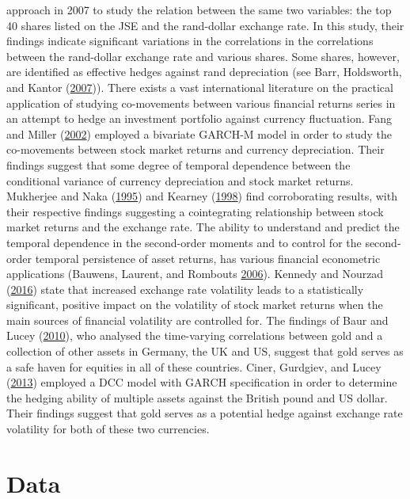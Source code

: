\documentclass[11pt,preprint, authoryear]{elsarticle}
\numberwithin{equation}{section}
\numberwithin{figure}{section}
\numberwithin{table}{section}
\begin{document}
approach in 2007 to study the relation between the same two variables:
the top 40 shares listed on the JSE and the rand-dollar exchange rate.
In this study, their findings indicate significant variations in the
correlations in the correlations between the rand-dollar exchange rate
and various shares. Some shares, however, are identified as effective
hedges against rand depreciation (see Barr, Holdsworth, and Kantor
(\protect\hyperlink{ref-barr2007}{2007})). There exists a vast
international literature on the practical application of studying
co-movements between various financial returns series in an attempt to
hedge an investment portfolio against currency fluctuation. Fang and
Miller (\protect\hyperlink{ref-fang2002}{2002}) employed a bivariate
GARCH-M model in order to study the co-movements between stock market
returns and currency depreciation. Their findings suggest that some
degree of temporal dependence between the conditional variance of
currency depreciation and stock market returns. Mukherjee and Naka
(\protect\hyperlink{ref-mukherjee1995}{1995}) and Kearney
(\protect\hyperlink{ref-kearney1998}{1998}) find corroborating results,
with their respective findings suggesting a cointegrating relationship
between stock market returns and the exchange rate. The ability to
understand and predict the temporal dependence in the second-order
moments and to control for the second-order temporal persistence of
asset returns, has various financial econometric applications (Bauwens,
Laurent, and Rombouts \protect\hyperlink{ref-bauwens2006}{2006}).
Kennedy and Nourzad (\protect\hyperlink{ref-kennedy2016}{2016}) state
that increased exchange rate volatility leads to a statistically
significant, positive impact on the volatility of stock market returns
when the main sources of financial volatility are controlled for. The
findings of Baur and Lucey (\protect\hyperlink{ref-baur2010}{2010}), who
analysed the time-varying correlations between gold and a collection of
other assets in Germany, the UK and US, suggest that gold serves as a
safe haven for equities in all of these countries. Ciner, Gurdgiev, and
Lucey (\protect\hyperlink{ref-ciner2013}{2013}) employed a DCC model
with GARCH specification in order to determine the hedging ability of
multiple assets against the British pound and US dollar. Their findings
suggest that gold serves as a potential hedge against exchange rate
volatility for both of these two currencies.

\pagebreak

\section{\texorpdfstring{Data \label{Data}}{Data }}\label{data}
\end{document}
